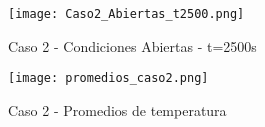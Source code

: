 \documentclass[12pt]{article}
\begin{document}
\begin{figure}[h]
\begin{center}
\texttt{[image: Caso2\_Abiertas\_t2500.png]}
\end{center}
\caption{Caso 2 - Condiciones Abiertas - t=2500s}
\end{figure}

\begin{figure}[h]
\begin{center}
\texttt{[image: promedios\_caso2.png]}
\end{center}
\caption{Caso 2 - Promedios de temperatura}
\end{figure}
\end{document}
